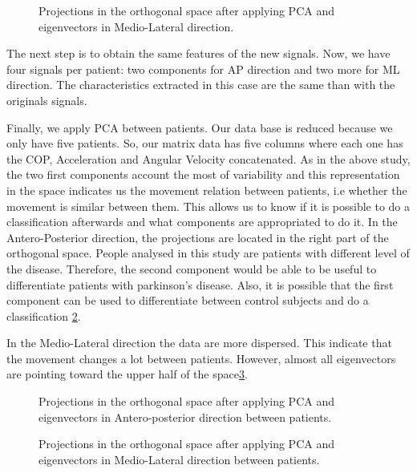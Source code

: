 \begin{figure}[H]
	\centering
	\caption{Projections in the orthogonal space after applying PCA and eigenvectors in Medio-Lateral direction.}
	\label{fig:PCA_ML}
\end{figure}

The next step is to obtain the same features of the new signals. Now, we have four signals per patient: two components for AP direction and two more for ML direction. The characteristics extracted in this case are the same than with the originals signals.

Finally, we apply PCA between patients. Our data base is reduced because we only have five patients. So, our matrix data has five columns where each one has the COP, Acceleration and Angular Velocity concatenated. As in the above study, the two first components account the most of variability and this representation in the space indicates us the movement relation between patients, i.e whether the movement is similar between them. This allows us to know if it is possible to do a classification afterwards and what components are appropriated to do it.
In the Antero-Posterior direction, the projections are located in the right part of the orthogonal space. People analysed in this study are patients with different level of the disease. Therefore, the second component would be able to be useful to differentiate patients with parkinson’s disease. Also, it is possible that the first component can be used to differentiate between control subjects and do a classification \ref{fig:PCA_AP_patients}.

In the Medio-Lateral direction the data are more dispersed. This indicate that the movement changes a lot between patients. However, almost all eigenvectors are pointing toward the upper half of the space\ref{fig:PCA_ML_patients}.

\begin{figure}[H]
	\centering
	\caption{Projections in the orthogonal space after applying PCA and eigenvectors in Antero-posterior direction between patients.}
	\label{fig:PCA_AP_patients}
\end{figure}

\begin{figure}[H]
	\centering
	\caption{Projections in the orthogonal space after applying PCA and eigenvectors in Medio-Lateral direction between patients.}
	\label{fig:PCA_ML_patients}
\end{figure}



